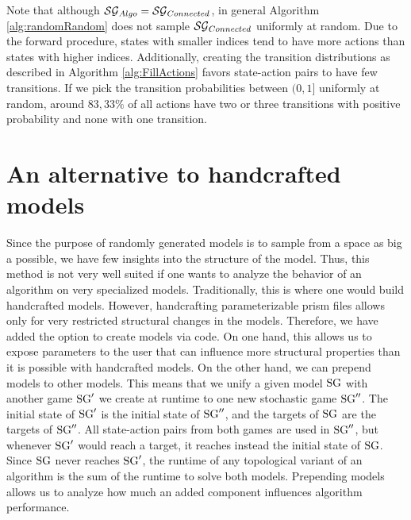 Note that although $\mathcal{SG}_{Algo} = \mathcal{SG}_{Connected}$, in general Algorithm \ref{alg:randomRandom} does not sample $\mathcal{SG}_{Connected}$ uniformly at random.
Due to the forward procedure, states with smaller indices tend to have more actions than states with higher indices.
Additionally, creating the transition distributions as described in Algorithm \ref{alg:FillActions} favors state-action pairs to have few transitions.
If we pick the transition probabilities between $(0, 1]$ uniformly at random, around $83,33\%$ of all actions have two or three transitions with positive probability and 
none with one transition.

\section{An alternative to handcrafted models}
Since the purpose of randomly generated models is to sample from a space as big a possible, we have few insights into the structure of the model.
Thus, this method is not very well suited if one wants to analyze the behavior of an algorithm on very specialized models. 
Traditionally, this is where one would build handcrafted models. 
However, handcrafting parameterizable prism files allows only for very restricted structural changes in the models. 
Therefore, we have added the option to create models via code. 
On one hand, this allows us to expose parameters to the user that can influence more structural properties than it is possible with handcrafted models.
On the other hand, we can prepend models to other models.
This means that we unify a given model $\textrm{SG}$ with another game $\textrm{SG}'$ we create at runtime to one new stochastic game $\textrm{SG}''$.
The initial state of $\textrm{SG}'$ is the initial state of $\textrm{SG}''$, and the targets of $\textrm{SG}$ are the targets of $\textrm{SG}''$.
All state-action pairs from both games are used in $\textrm{SG}''$, but whenever $\textrm{SG}'$ would reach a target, it reaches instead the initial state of $\textrm{SG}$.
Since $\textrm{SG}$ never reaches $\textrm{SG}'$, the runtime of any topological variant of an algorithm is the sum of the runtime to solve both models.
Prepending models allows us to analyze how much an added component influences algorithm performance.


